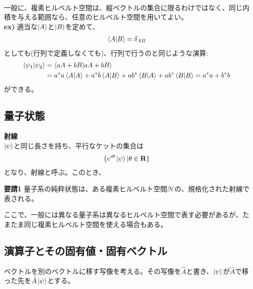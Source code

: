 \documentclass[a4paper,11pt]{jsarticle}
\begin{document}
\\
一般に、複素ヒルベルト空間は、縦ベクトルの集合に限るわけではなく、同じ内積を与える範囲なら、任意のヒルベルト空間を用いてよい。\\
\textbf{ex)}
適当な$\ket{A}$と$\ket{B}$を定めて、
\begin{align}
\braket{A}{B}=\delta_{AB}
\end{align}
としても(行列で定義しなくても)、行列で行うのと同じような演算:
\begin{align}
\braket{\psi_1}{\psi_2}&=\braket{aA+bB}{aA+bB}\\
&=a^{*}a\braket{A}{A}+a^{*}b\braket{A}{B}+ab^{*}\braket{B}{A}+ab^{*}\braket{B}{B}
=a^{*}a+b^{*}b
\end{align}
ができる。
\bigskip

\subsection{量子状態}
\textbf{射線}\\
$\ket{\psi}$と同じ長さを持ち、平行なケットの集合は
\begin{align}
\{e^{i\theta}\ket{\psi}|\theta \in\vb{R}\}
\end{align}
となり、射線と呼ぶ。このとき、
\begin{itembox}[l]{\textbf {要請1}}
量子系の純粋状態は、ある複素ヒルベルト空間$\mathcal H$の、規格化された射線で表される。
\end{itembox}
ここで、一般には異なる量子系は異なるヒルベルト空間で表す必要があるが、たまたま同じ複素ヒルベルト空間を使える場合もある。
\newpage

\subsection{演算子とその固有値・固有ベクトル}
ベクトルを別のベクトルに移す写像を考える。その写像を$\hat{A}$と書き、$\ket{\psi}$が$\hat{A}$で移った先を$\hat{A}\ket{\psi}$とする。
\end{document}
